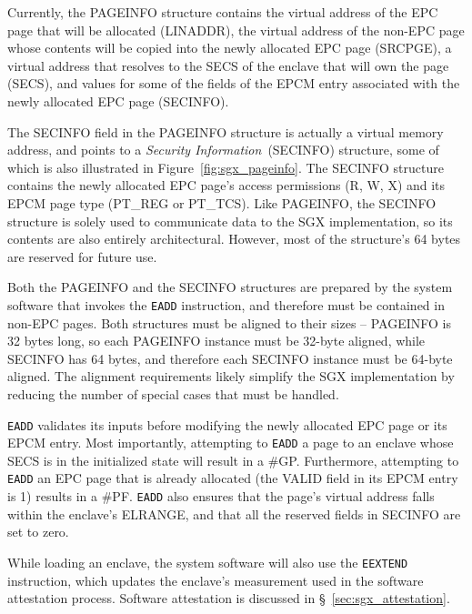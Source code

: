 Currently, the PAGEINFO structure contains the virtual address of the EPC page
that will be allocated (LINADDR), the virtual address of the non-EPC page whose
contents will be copied into the newly allocated EPC page (SRCPGE), a virtual
address that resolves to the SECS of the enclave that will own the page (SECS),
and values for some of the fields of the EPCM entry associated with the newly
allocated EPC page (SECINFO).

The SECINFO field in the PAGEINFO structure is actually a virtual memory
address, and points to a \textit{Security Information}~(SECINFO) structure,
some of which is also illustrated in Figure~\ref{fig:sgx_pageinfo}. The SECINFO
structure contains the newly allocated EPC page's access permissions (R, W, X)
and its EPCM page type (PT\_REG or PT\_TCS). Like PAGEINFO, the SECINFO
structure is solely used to communicate data to the SGX implementation, so its
contents are also entirely architectural. However, most of the structure's
64 bytes are reserved for future use.

Both the PAGEINFO and the SECINFO structures are prepared by the system
software that invokes the \texttt{EADD} instruction, and therefore must be
contained in non-EPC pages. Both structures must be aligned to their sizes --
PAGEINFO is 32 bytes long, so each PAGEINFO instance must be 32-byte aligned,
while SECINFO has 64 bytes, and therefore each SECINFO instance must be
64-byte aligned. The alignment requirements likely simplify the SGX
implementation by reducing the number of special cases that must be handled.

\texttt{EADD} validates its inputs before modifying the newly allocated EPC
page or its EPCM entry. Most importantly, attempting to \texttt{EADD} a page to
an enclave whose SECS is in the initialized state will result in a \#GP.
Furthermore, attempting to \texttt{EADD} an EPC page that is already allocated
(the VALID field in its EPCM entry is 1) results in a \#PF. \texttt{EADD} also
ensures that the page's virtual address falls within the enclave's ELRANGE, and
that all the reserved fields in SECINFO are set to zero.

While loading an enclave, the system software will also use the
\texttt{EEXTEND} instruction, which updates the enclave's measurement used in
the software attestation process. Software attestation is discussed in
\S~\ref{sec:sgx_attestation}.


\label{sec:sgx_einit_overview}


